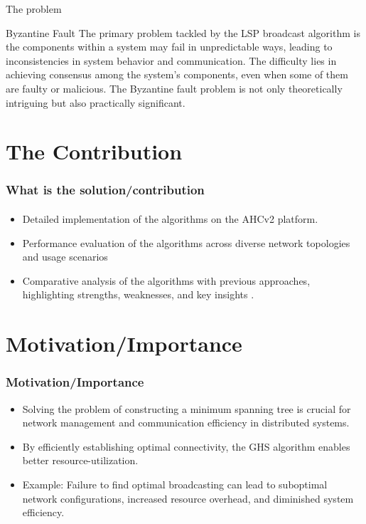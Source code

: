 \documentclass[11pt]{beamer}              %
\begin{document}
\begin{frame}{The problem}
\begin{block}{Byzantine Fault} 
The primary problem tackled by the LSP broadcast algorithm is the components within a system may fail in unpredictable ways, leading to inconsistencies in system behavior and communication. The difficulty lies in achieving consensus among the system’s components, even when some of them are faulty or malicious. The Byzantine fault problem is not only theoretically intriguing but also practically significant.
\end{block}
\end{frame}

\section{The Contribution}
\begin{frame}
\frametitle{What is the solution/contribution}
\framesubtitle{}
\begin{itemize}
\item Detailed implementation of the algorithms on the AHCv2 platform.
\item Performance evaluation of the algorithms across diverse network topologies and usage scenarios
\item Comparative analysis of the algorithms with previous approaches, highlighting strengths, weaknesses, and key
insights
.\end{itemize}
\end{frame}


\section{Motivation/Importance}
\begin{frame}
\frametitle{Motivation/Importance}
\begin{itemize}
    \item Solving the problem of constructing a minimum spanning tree is crucial for network management and communication
efficiency in distributed systems. 
    \item By efficiently establishing optimal connectivity, the GHS algorithm enables better resource-utilization.
    \item Example: Failure to find optimal broadcasting can lead to suboptimal network configurations, increased resource overhead, and diminished system efficiency.
\end{itemize}
\end{frame}
\end{document}
